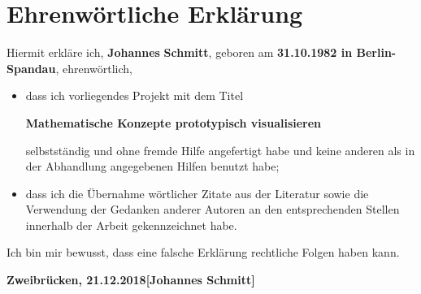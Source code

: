 \chapter*{Ehrenwörtliche Erklärung}
Hiermit erkläre ich, \textbf{Johannes} \textbf{Schmitt}, geboren am
\textbf{31.10.1982 in Berlin-Spandau}, ehrenwörtlich,
\begin{itemize}
\item dass ich vorliegendes Projekt mit dem Titel

\textbf{Mathematische Konzepte prototypisch visualisieren}

selbstständig und ohne fremde Hilfe angefertigt habe und keine anderen als in der
Abhandlung angegebenen Hilfen benutzt habe;
\item dass ich die Übernahme wörtlicher Zitate aus der Literatur
sowie die Verwendung der Gedanken anderer Autoren an den entsprechenden
Stellen innerhalb der Arbeit gekennzeichnet habe.
\end{itemize}
Ich bin mir bewusst, dass eine falsche Erklärung rechtliche Folgen haben kann.
\vspace*{3cm}

\textbf{Zweibrücken, 21.12.2018}\hfill\textbf{[Johannes Schmitt]}
